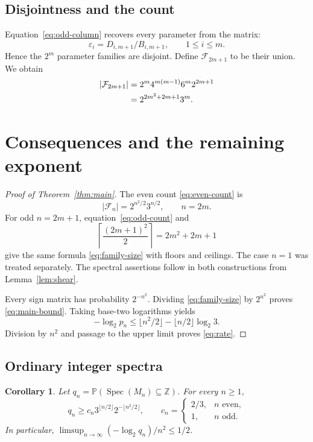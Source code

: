 \documentclass[11pt]{amsart}
\newtheorem{corollary}[theorem]{Corollary}
\theoremstyle{definition}
\theoremstyle{remark}
\newcommand{\Z}{\mathbb Z}
\newcommand{\Pp}{\mathbb P}
\newcommand{\F}{\mathcal F}
\DeclareMathOperator{\Spec}{Spec}
\numberwithin{equation}{section}
\begin{document}
\subsection{Disjointness and the count}

Equation~\eqref{eq:odd-column} recovers every parameter from the matrix:
\begin{equation}\label{eq:odd-recovery}
 \varepsilon_i=D_{i,m+1}/B_{i,m+1},\qquad 1\leq i\leq m.
\end{equation}
Hence the $2^m$ parameter families are disjoint. Define $\F_{2m+1}$ to be their union. We obtain
\begin{align}
 |\F_{2m+1}|
 &=2^m4^{m(m-1)}6^m2^{2m+1}\notag\\
 &=2^{2m^2+2m+1}3^m.\label{eq:odd-count}
\end{align}

\section{Consequences and the remaining exponent}\label{sec:consequences}

\begin{proof}[Proof of Theorem~\ref{thm:main}]
The even count \eqref{eq:even-count} is
\[
 |\F_n|=2^{n^2/2}3^{n/2},\qquad n=2m.
\]
For odd $n=2m+1$, equation~\eqref{eq:odd-count} and
\[
 \left\lceil\frac{(2m+1)^2}{2}\right\rceil=2m^2+2m+1
\]
give the same formula \eqref{eq:family-size} with floors and ceilings. The case $n=1$ was treated separately. The spectral assertions follow in both constructions from Lemma~\ref{lem:shear}.

Every sign matrix has probability $2^{-n^2}$. Dividing \eqref{eq:family-size} by $2^{n^2}$ proves \eqref{eq:main-bound}. Taking base-two logarithms yields
\[
 -\log_2p_n
 \leq \lfloor n^2/2\rfloor-\lfloor n/2\rfloor\log_2 3.
\]
Division by $n^2$ and passage to the upper limit proves \eqref{eq:rate}.
\end{proof}

\subsection{Ordinary integer spectra}

\begin{corollary}\label{cor:integer}
Let $q_n=\Pp(\Spec(M_n)\subseteq\Z)$. For every $n\geq1$,
\begin{equation}\label{eq:integer-bound}
 q_n\geq c_n3^{\lfloor n/2\rfloor}2^{-\lfloor n^2/2\rfloor},
 \qquad
 c_n=\begin{cases}2/3,&n\text{ even},\\1,&n\text{ odd}.\end{cases}
\end{equation}
In particular, $\limsup_{n\to\infty}(-\log_2 q_n)/n^2\leq1/2$.
\end{corollary}
\end{document}

